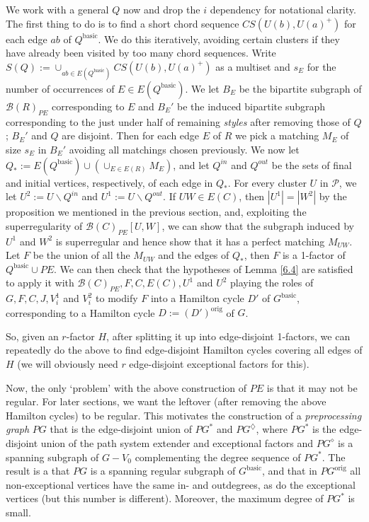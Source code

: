 \documentclass[10pt,letterpaper, reqno]{amsart}
\theoremstyle{definition}
\numberwithin{equation}{section}
\begin{document}
We work with a general $Q$ now and drop the $i$ dependency for notational clarity. The first thing to do is to find a short chord sequence $CS(U(b),U(a)^+)$ for each edge $ab$ of $Q^\text{basic}$. We do this iteratively, avoiding certain clusters if they have already been visited by too many chord sequences. Write $S(Q) := \cup_{ab\in E(Q^\text{basic})}CS(U(b),U(a)^+)$ as a multiset and $s_E$ for the number of occurrences of $E \in E(Q^\text{basic})$. We let $B_E$ be the bipartite subgraph of $\mathcal{B}(R)_{PE}$ corresponding to $E$ and $B_E'$ be the induced bipartite subgraph corresponding to the just under half of remaining \textit{styles} after removing those of $Q$; $B_E'$ and $Q$ are disjoint. Then for each edge $E$ of $R$ we pick a matching $M_E$ of size $s_E$ in $B_{E}'$ avoiding all matchings chosen previously. We now let $Q_* := E(Q^\text{basic})\cup (\cup_{E \in E(R)}M_E)$, and let $Q^\textit{in}$ and $Q^\textit{out}$ be the sets of final and initial vertices, respectively, of each edge in $Q_{*}$. For every cluster $U$ in $\mathcal{P}$, we let $U^2:=U \backslash Q^\textit{in}$ and $U^1:=U\backslash Q^\textit{out}$. If $UW \in E(C)$, then $|U^1|=|W^2|$ by the proposition we mentioned in the previous section, and, exploiting the superregularity of $\mathcal{B}(C)_{PE}[U,W]$, we can show that the subgraph induced by $U^1$ and $W^2$ is superregular and hence show that it has a perfect matching $M_{UW}$. Let $F$ be the union of all the $M_{UW}$ and the edges of $Q_*$, then $F$ is a 1-factor of $Q^\text{basic} \cup PE$. We can then check that the hypotheses of Lemma \ref{6.4} are satisfied to apply it with $\mathcal{B}(C)_{PE}, F,C,E(C),U^1$ and $U^2$ playing the roles of $G,F,C,J,V_i^1$ and $V^2_i$ to modify $F$ into a Hamilton cycle $D'$ of $G^\text{basic}$, corresponding to a Hamilton cycle $D:=(D')^\text{orig}$ of $G$. 

So, given an $r$-factor $H$, after splitting it up into edge-disjoint 1-factors, we can repeatedly do the above to find edge-disjoint Hamilton cycles covering all edges of $H$ (we will obviously need $r$ edge-disjoint exceptional factors for this). 

Now, the only `problem' with the above construction of $PE$ is that it may not be regular. For later sections, we want the leftover (after removing the above Hamilton cycles) to be regular. This motivates the construction of a \textit{preprocessing graph} $PG$ that is the edge-disjoint union of $PG^*$ and $PG^\diamondsuit$, where $PG^*$ is the edge-disjoint union of the path system extender and exceptional factors and $PG^\diamond$ is a spanning subgraph of $G-V_0$ complementing the degree sequence of $PG^*$. The result is a that $PG$ is a spanning regular subgraph of $G^\text{basic}$, and that in $PG^\text{orig}$ all non-exceptional vertices have the same in- and outdegrees, as do the exceptional vertices (but this number is different). Moreover, the maximum degree of $PG^*$ is small. 
\end{document}
